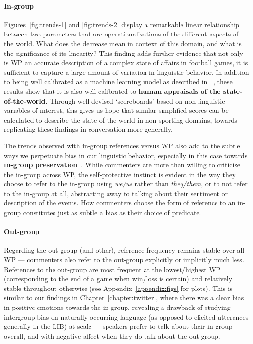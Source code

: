 \paragraph{In-group} Figures~\ref{fig:trends-1} and \ref{fig:trends-2} display a remarkable linear relationship between two parameters that are operationalizations of the different aspects of the world. What does the decrease mean in context of this domain, and what is the significance of its linearity? This finding adds further evidence that not only is WP an accurate description of a complex state of affairs in football games, it is sufficient to capture a large amount of variation in linguistic behavior. In addition to being well calibrated as a machine learning model as described in ~\citet{baldwin2021nflfastr}, these results show that it is also well calibrated to \textbf{human appraisals of the state-of-the-world}. Through well devised `scoreboards' based on non-linguistic variables of interest, this gives us hope that similar simplified scores can be calculated to describe the state-of-the-world in non-sporting domains, towards replicating these findings in conversation more generally.

The trends observed with in-group references versus WP also add to the subtle ways we perpetuate bias in our linguistic behavior, especially in this case towards \textbf{in-group preservation}~\citep{maass_linguistic_1999}. While commenters are more than willing to criticize the in-group across WP, the self-protective instinct is evident in the way they choose to refer to the in-group using \emph{we/us} rather than \emph{they/them}, or to not refer to the in-group at all, abstracting away to talking about their sentiment or description of the events. How commenters choose the form of reference to an in-group constitutes just as subtle a bias as their choice of predicate.

\paragraph{Out-group} Regarding the out-group (and other), reference frequency remains stable over all WP --- commenters also refer to the out-group explicitly or implicitly much less. References to the out-group are most frequent at the lowest/highest WP (corresponding to the end of a game when win/loss is certain) and relatively stable throughout otherwise (see Appendix~\ref{appendix:figs} for plots). This is similar to our findings in Chapter~\ref{chapter:twitter}, where there was a clear bias in positive emotions towards the in-group, revealing a drawback of studying intergroup bias on naturally occurring language (as opposed to elicited utterances generally in the LIB) at scale --- speakers prefer to talk about their in-group overall, and with negative affect when they do talk about the out-group.

